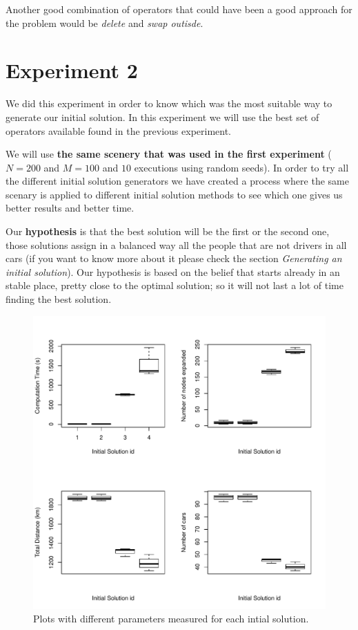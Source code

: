 \documentclass[12]{article}
\begin{document}
Another good combination of operators that could have been a good approach for the problem would be \textit{delete} and \textit{swap outisde}.

\section{Experiment 2}
We did this experiment in order to know which was the most suitable way to generate our initial solution. In this experiment we will use the best set of operators available found in the previous experiment.

We will use \textbf{the same scenery that was used in the first experiment} ($N=200$ and $M=100$ and $10$ executions using random seeds).  In order to try all the different initial solution generators we have created a process where the same scenary is applied to different initial solution methods to see which one gives us better results and better time. 

Our \textbf{hypothesis} is that the best solution will be the first or the second one, those solutions assign in a balanced way all the people that are not drivers in all cars (if you want to know more about it please check the section \textit{Generating an initial solution}). Our hypothesis is based on the belief that starts already in an stable place, pretty close to the optimal solution; so it will not last a lot of time finding the best solution. 

\begin{figure}[H]
\captionsetup{justification=centering}
\centering
\includegraphics[scale=0.70]{Results/data_A.pdf}
\caption{Plots with different parameters measured for each intial solution.}
\label{operators}
\end{figure}
\end{document}
